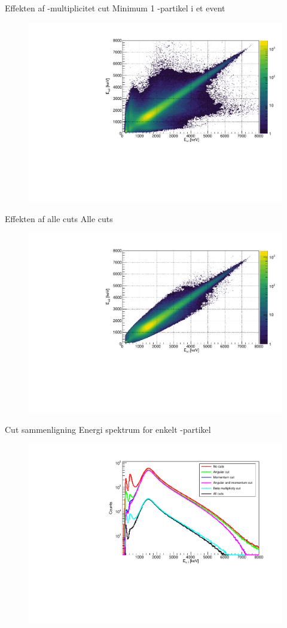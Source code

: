 \begin{frame}{Effekten af \be-multiplicitet cut}
	Minimum 1 \be-partikel i et event
	\begin{figure}
		\includegraphics[width=.7\columnwidth]{../figures/EEBetaMulCut.pdf}
	\end{figure}
\end{frame}

\begin{frame}{Effekten af alle cuts}
	Alle cuts 
	\begin{figure}
		\includegraphics[width=.7\columnwidth]{../figures/EE.pdf}
	\end{figure}
\end{frame}

\begin{frame}{Cut sammenligning}
	Energi spektrum for enkelt \al-partikel
	\begin{figure}
		\includegraphics[width=.7\columnwidth]{../figures/cutCompare.pdf}
	\end{figure}
\end{frame}

